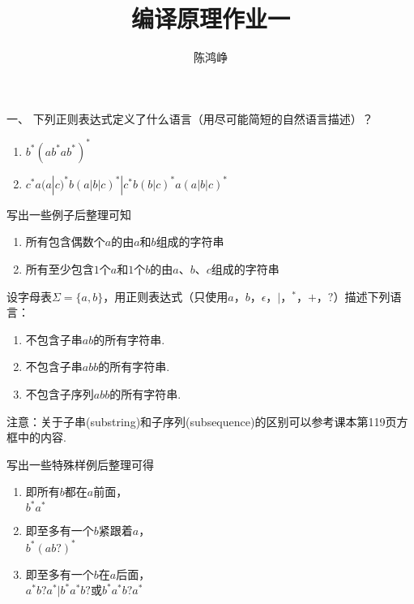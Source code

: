 \documentclass[logo,reportComp]{thesis}
\title{编译原理作业一}
\subtitle{}
\author{陈鸿峥}
\begin{document}
\maketitle

\begin{question}
一、	下列正则表达式定义了什么语言（用尽可能简短的自然语言描述）？
\begin{enumerate}
	\item $b^*(ab^*ab^*)^*$
	\item $c^*a(a|c)^*b(a|b|c)^*|c^*b(b|c)^*a(a|b|c)^*$
\end{enumerate}
\end{question}
\begin{answer}
写出一些例子后整理可知
\begin{enumerate}
	\item 所有包含偶数个$a$的由$a$和$b$组成的字符串
	\item 所有至少包含$1$个$a$和$1$个$b$的由$a$、$b$、$c$组成的字符串
\end{enumerate}
\end{answer}

\begin{question}
设字母表$\Sigma=\{a,b\}$，用正则表达式（只使用$a$，$b$，$\epsilon$，$|$，${}^*$，$+$，$?$）描述下列语言：
\begin{enumerate}
	\item 不包含子串$ab$的所有字符串.
	\item 不包含子串$abb$的所有字符串.
	\item 不包含子序列$abb$的所有字符串.
\end{enumerate}
注意：关于子串(substring)和子序列(subsequence)的区别可以参考课本第119页方框中的内容.
\end{question}
\begin{answer}
写出一些特殊样例后整理可得
\begin{enumerate}
	\item 即所有$b$都在$a$前面，\\$b^*a^*$
	\item 即至多有一个$b$紧跟着$a$，\\$b^*(ab?)^*$
	\item 即至多有一个$b$在$a$后面，\\$a^*b?a^*|b^*a^*b?$或$b^*a^*b?a^*$
\end{enumerate}
\end{answer}
\end{document}
